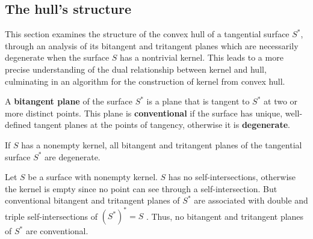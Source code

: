 \documentclass[12pt]{article}
\begin{document}

\subsection{The hull's structure}
\label{sec:cusp}

This section examines the structure of the convex hull of a tangential
surface $S^*$, through an analysis of its bitangent and tritangent planes
which are necessarily degenerate when the surface $S$ has a nontrivial kernel.
This leads to a more precise understanding of the 
dual relationship between kernel and hull, culminating in an
algorithm for the construction of kernel from convex hull.


\begin{defn2}
A {\bf bitangent plane} of the surface $S^*$ is a plane that
is tangent to $S^*$ at two or more distinct points.
This plane is {\bf conventional} if the surface has unique, well-defined 
tangent planes at the points of tangency,
otherwise it is {\bf degenerate}.
\end{defn2}

\begin{lemma}
\label{lem:degenerate}
If $S$ has a nonempty kernel,
all bitangent and tritangent planes of the tangential surface $S^*$ are 
degenerate.
\end{lemma}
\prf
Let $S$ be a surface with nonempty kernel.
$S$ has no self-intersections, otherwise the kernel is empty
since no point can see through a self-intersection.
But conventional bitangent and tritangent planes of $S^*$ are associated
with double and triple self-intersections of $(S^*)^* = S$ \cite{jj02,jj02tangsurf}.
Thus, no bitangent and tritangent planes of $S^*$ are conventional.
\QED

\end{document}
